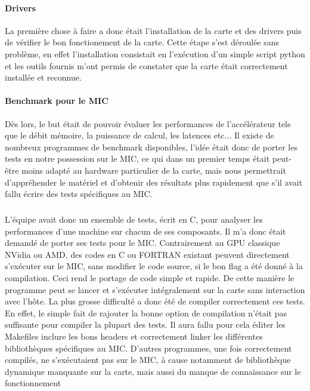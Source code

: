 \documentclass[11pt]{article}
\begin{document}
				\paragraph{Drivers}
				La première chose à faire a donc était l'installation de la carte et des drivers puis de vérifier le bon
				fonctionement de la carte. Cette étape s'est déroulée sans problème, en effet l'installation consistait en 
				l'exécution d'un simple script python et les outils fournis m'ont permis de constater que la carte était
				correctement installée et reconnue.
				\paragraph{Benchmark pour le MIC}
				Dès lors, le but était de pouvoir évaluer les performances de l'accélérateur tels que le débit mémoire,
				la puissance de calcul, les latences etc... \newline
				Il existe de nombreux programmes de benchmark disponibles, l'idée était donc de porter les tests en notre
				possession sur le MIC, ce qui dans un premier temps était peut-être moins adapté au hardware particulier
				de la carte, mais nous permettrait d'appréhender le matériel et d'obtenir des résultats plus rapidement 
				que s'il avait fallu écrire des tests spécifiques au MIC.
					\subparagraph{}
					L'équipe avait donc un ensemble de tests, écrit en C, pour analyser les performances d'une machine sur 
					chacun de ses composants. Il m'a donc était demandé de porter ses tests pour le MIC. \newline
					Contrairement au GPU classique NVidia ou AMD, des codes en C ou FORTRAN existant peuvent directement
					s'exécuter sur le MIC, sans modifier le code source, si le bon flag a été donné à la compilation. Ceci 
					rend le portage de code simple et rapide. De cette manière le programme peut se lancer et s'exécuter 
					intégralement sur la carte sans interaction avec l'hôte.\newline
					La plus grosse difficulté a donc été de compiler correctement ces tests. En effet, le simple fait de rajouter 
					la bonne option de compilation n'était pas suffisante pour compiler la plupart des tests. Il aura fallu pour cela éditer 
					les Makefiles inclure les bons headers et correctement linker les différentes bibliothèques spécifiques au 
					MIC. D'autres programmes, une fois correctement compilés, ne s'exécutaient pas sur le MIC, à cause notamment 
					de bibliothèque dynamique manquante sur la carte, mais aussi du manque de connaissance sur le fonctionnement 
\end{document}
